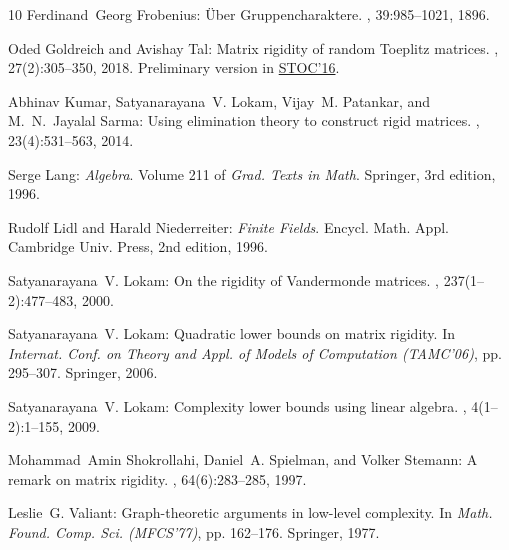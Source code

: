 \documentclass[11pt]{article}
\numberwithin{equation}{section}
\theoremstyle{definition}
\theoremstyle{plain}
\theoremstyle{definition}
\begin{document}
\begin{thebibliography}{10}
{\sc Ferdinand~Georg Frobenius}: {\"U}ber {G}ruppencharaktere.
, 39:985--1021, 1896.

{\sc Oded Goldreich and Avishay Tal}: Matrix rigidity of random {T}oeplitz
  matrices.
, 27(2):305--350, 2018.
\newblock Preliminary version in
  \href{https://doi.org/10.1145/2897518.2897633}{STOC'16}.
\newblock [\epfmtdoi{10.1007/s00037-016-0144-9}]

{\sc Abhinav Kumar, Satyanarayana~V. Lokam, Vijay~M. Patankar, and
  M.~N.~Jayalal Sarma}: Using elimination theory to construct rigid matrices.
, 23(4):531--563, 2014.

{\sc Serge Lang}: {\em Algebra}.
\newblock Volume 211 of {\em Grad. Texts in Math}.
\newblock Springer, 3rd edition, 1996.

{\sc Rudolf Lidl and Harald Niederreiter}: {\em Finite Fields}.
\newblock Encycl. Math. Appl. Cambridge Univ. Press, 2nd edition, 1996.

{\sc Satyanarayana~V. Lokam}: On the rigidity of {V}andermonde matrices.
, 237(1--2):477--483, 2000.
\newblock [\epfmtdoi{10.1016/S0304-3975(00)00008-6}]

{\sc Satyanarayana~V. Lokam}: Quadratic lower bounds on matrix rigidity.
\newblock In {\em Internat. Conf. on Theory and Appl. of Models of Computation
  (TAMC'06)}, pp. 295--307. Springer, 2006.
\newblock [\epfmtdoi{10.1007/11750321\_28}]

{\sc Satyanarayana~V. Lokam}: Complexity lower bounds using linear algebra.
,
  4(1--2):1--155, 2009.
\newblock [\epfmtdoi{10.1561/0400000011}]

{\sc Mohammad~Amin Shokrollahi, Daniel~A. Spielman, and Volker Stemann}: A
  remark on matrix rigidity.
, 64(6):283--285, 1997.
\newblock [\epfmtdoi{10.1016/S0020-0190(97)00190-7}]

{\sc Leslie~G. Valiant}: Graph-theoretic arguments in low-level complexity.
\newblock In {\em Math. Found. Comp. Sci. (MFCS'77)}, pp. 162--176. Springer,
  1977.
\newblock [\epfmtdoi{10.1007/3-540-08353-7\_135}]

\end{thebibliography}
\end{document}
